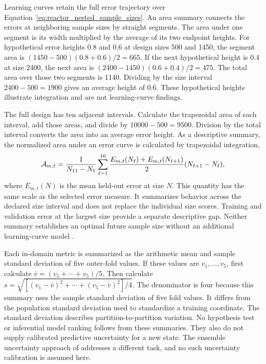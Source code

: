 Learning curves retain the full error trajectory over Equation~\eqref{eq:reactor_nested_sample_sizes}. An area summary connects the errors at neighboring sample sizes by straight segments. The area under one segment is its width multiplied by the average of its two endpoint heights. For hypothetical error heights 0.8 and 0.6 at design sizes 500 and 1450, the segment area is $(1450-500)(0.8+0.6)/2=665$. If the next hypothetical height is 0.4 at size 2400, the next area is $(2400-1450)(0.6+0.4)/2=475$. The total area over those two segments is 1140. Dividing by the size interval $2400-500=1900$ gives an average height of 0.6. These hypothetical heights illustrate integration and are not learning-curve findings.

The full design has ten adjacent intervals. Calculate the trapezoidal area of each interval, add those areas, and divide by $10000-500=9500$. Division by the total interval converts the area into an average error height. As a descriptive summary, the normalized area under an error curve is calculated by trapezoidal integration,
\begin{equation}
\equationname{Normalized trapezoidal area under a learning curve}
\mathcal{A}_{m,t}=
\frac{1}{N_{11}-N_1}
\sum_{\ell=1}^{10}\frac{E_{m,t}(N_\ell)+E_{m,t}(N_{\ell+1})}{2}
(N_{\ell+1}-N_\ell),
\label{eq:projection_learning_curve_area}
\end{equation}
where $E_{m,t}(N)$ is the mean held-out error at size $N$. This quantity has the same scale as the selected error measure. It summarizes behavior across the declared size interval and does not replace the individual size scores. Training and validation error at the largest size provide a separate descriptive gap. Neither summary establishes an optimal future sample size without an additional learning-curve model \citep{VieringLoog2023}.

Each in-domain metric is summarized as the arithmetic mean and sample standard deviation of five outer-fold values. If these values are $v_1,\ldots,v_5$, first calculate $\bar v=(v_1+\cdots+v_5)/5$. Then calculate $s=\sqrt{[(v_1-\bar v)^2+\cdots+(v_5-\bar v)^2]/4}$. The denominator is four because this summary uses the sample standard deviation of five fold values. It differs from the population standard deviation used to standardize a training coordinate. The standard deviation describes partition-to-partition variation. No hypothesis test or inferential model ranking follows from these summaries. They also do not supply calibrated predictive uncertainty for a new state. The ensemble uncertainty approach of \citet{Lakshminarayanan2017} addresses a different task, and no such uncertainty calibration is assumed here.


